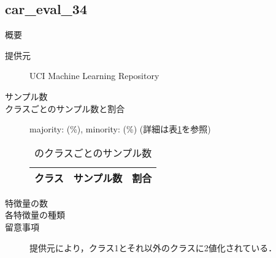\subsection{car\_eval\_34}
\begin{description}
    \item[概要] \cite{}
    \item[提供元] UCI Machine Learning Repository
    \item[サンプル数] 
    \item[クラスごとのサンプル数と割合] majority:  (\%), minority:  (\%) (詳細は表\ref{tab:}を参照)

        \begin{table}[htbp]
            \centering
            \caption{のクラスごとのサンプル数}
            \label{tab:}
            \begin{tabular}{lrc} \hline
                \multicolumn{1}{c}{クラス}&
                \multicolumn{1}{c}{サンプル数}&
                \multicolumn{1}{c}{割合}\\
                \hline
                \hline

                \hline
            \end{tabular}
        \end{table}

    \item[特徴量の数] 
    \item[各特徴量の種類] \mbox{}
        
    \item[留意事項] 提供元により，クラス1とそれ以外のクラスに2値化されている．
\end{description}

